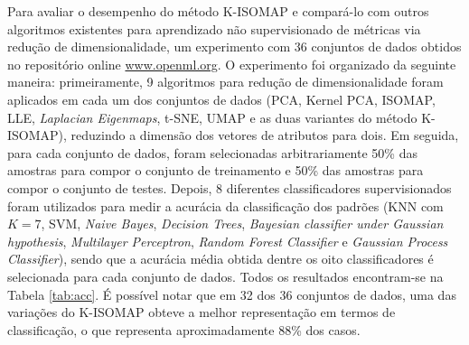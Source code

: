 \documentclass[a4paper,12pt]{article}
\begin{document}
Para avaliar o desempenho do método K-ISOMAP e compará-lo com outros algoritmos existentes para aprendizado não supervisionado de métricas via redução de dimensionalidade, um experimento com 36 conjuntos de dados obtidos no repositório online \url{www.openml.org}. O experimento foi organizado da seguinte maneira: primeiramente, 9 algoritmos para redução de dimensionalidade foram aplicados em cada um dos conjuntos de dados (PCA, Kernel PCA, ISOMAP, LLE, \emph{Laplacian Eigenmaps}, t-SNE, UMAP e as duas variantes do método K-ISOMAP), reduzindo a dimensão dos vetores de atributos para dois. Em seguida, para cada conjunto de dados, foram selecionadas arbitrariamente 50\% das amostras para compor o conjunto de treinamento e 50\% das amostras para compor o conjunto de testes. Depois, 8 diferentes classificadores supervisionados foram utilizados para medir a acurácia da classificação dos padrões (KNN com $K=7$, SVM, \emph{Naive Bayes}, \emph{Decision Trees}, \emph{Bayesian classifier under Gaussian hypothesis}, \emph{Multilayer Perceptron}, \emph{Random Forest Classifier} e \emph{Gaussian Process Classifier}), sendo que a acurácia média obtida dentre os oito classificadores é selecionada para cada conjunto de dados. Todos os resultados encontram-se na Tabela \ref{tab:acc}. É possível notar que em 32 dos 36 conjuntos de dados, uma das variações do K-ISOMAP obteve a melhor representação em termos de classificação, o que representa aproximadamente 88\% dos casos.
\end{document}

